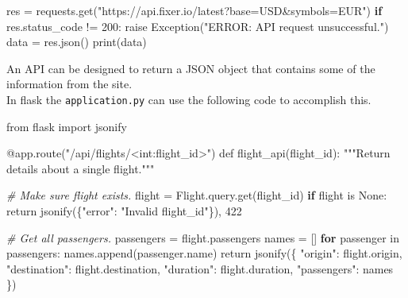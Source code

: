 \documentclass[]{book}
\newenvironment{Shaded}{\begin{snugshade}}{\end{snugshade}}
\newcommand{\BuiltInTok}[1]{#1}
\newcommand{\CommentTok}[1]{\textcolor[rgb]{0.56,0.35,0.01}{\textit{#1}}}
\newcommand{\ExtensionTok}[1]{#1}
\newcommand{\KeywordTok}[1]{\textcolor[rgb]{0.13,0.29,0.53}{\textbf{#1}}}
\newcommand{\NormalTok}[1]{#1}
\newcommand{\StringTok}[1]{\textcolor[rgb]{0.31,0.60,0.02}{#1}}
\begin{document}
\begin{Shaded}
\begin{Highlighting}[]
\ExtensionTok{res}\NormalTok{ = requests.get(}\StringTok{"https://api.fixer.io/latest?base=USD&symbols=EUR"}\NormalTok{)}
\KeywordTok{if} \ExtensionTok{res.status_code}\NormalTok{ != 200:                                            }
    \ExtensionTok{raise}\NormalTok{ Exception(}\StringTok{"ERROR: API request unsuccessful."}\NormalTok{)               }
    \ExtensionTok{data}\NormalTok{ = res.json()                                                     }
    \ExtensionTok{print}\NormalTok{(data)                                                           }
\end{Highlighting}
\end{Shaded}

An API can be designed to return a JSON object that contains some of the information from the site.\\
In flask the \texttt{application.py} can use the following code to accomplish this.

\begin{Shaded}
\begin{Highlighting}[]
\ExtensionTok{from}\NormalTok{ flask import jsonify}

\ExtensionTok{@app.route}\NormalTok{(}\StringTok{"/api/flights/<int:flight_id>"}\NormalTok{)                 }
\ExtensionTok{def}\NormalTok{ flight_api(flight_id)}\BuiltInTok{:}                                 
    \StringTok{"""Return details about a single flight."""}            
                                                           
    \CommentTok{# Make sure flight exists.                             }
    \ExtensionTok{flight}\NormalTok{ = Flight.query.get(flight_id)                   }
    \KeywordTok{if} \ExtensionTok{flight}\NormalTok{ is None:                                     }
        \BuiltInTok{return}\NormalTok{ jsonify(\{}\StringTok{"error"}\NormalTok{: }\StringTok{"Invalid flight_id"}\NormalTok{\}), }\ExtensionTok{422}
                                                           
    \CommentTok{# Get all passengers.                                  }
    \ExtensionTok{passengers}\NormalTok{ = flight.passengers                         }
    \ExtensionTok{names}\NormalTok{ = []                                             }
    \KeywordTok{for} \ExtensionTok{passenger}\NormalTok{ in passengers:                           }
        \ExtensionTok{names.append}\NormalTok{(passenger.name)                       }
    \BuiltInTok{return}\NormalTok{ jsonify(\{                                       }
            \StringTok{"origin"}\NormalTok{: }\ExtensionTok{flight.origin}\NormalTok{,                       }
            \StringTok{"destination"}\NormalTok{: }\ExtensionTok{flight.destination}\NormalTok{,             }
            \StringTok{"duration"}\NormalTok{: }\ExtensionTok{flight.duration}\NormalTok{,                   }
            \StringTok{"passengers"}\NormalTok{: }\ExtensionTok{names}                            
\NormalTok{        \})                                                 }
\end{Highlighting}
\end{Shaded}
\end{document}
